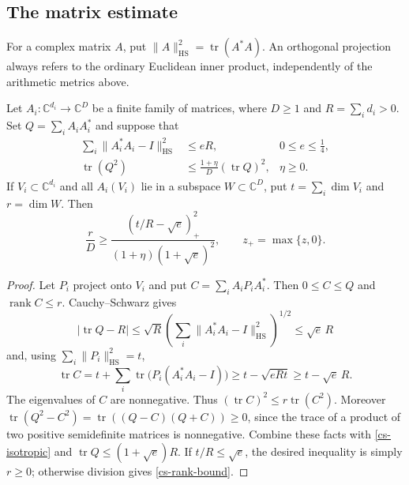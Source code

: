 \subsection{The matrix estimate}

For a complex matrix $A$, put
$\|A\|_{\mathrm{HS}}^2=\operatorname{tr}(A^*A)$.
An orthogonal projection always refers to the ordinary Euclidean inner
product, independently of the arithmetic metrics above.

\begin{lemma}\label{cs-dimension}
Let $A_i:\mathbb C^{d_i}\to\mathbb C^D$ be a finite family of matrices,
where $D\ge1$ and $R=\sum_i d_i>0$.
Set $Q=\sum_i A_iA_i^*$ and suppose that
\begin{align}
 \sum_i\|A_i^*A_i-I\|_{\mathrm{HS}}^2&\le eR,
       &0\le e\le\tfrac14,\label{cs-diagonal}\\
 \operatorname{tr}(Q^2)&\le
       \frac{1+\eta}{D}(\operatorname{tr}Q)^2,
       &\eta\ge0.\label{cs-isotropic}
\end{align}
If $V_i\subset\mathbb C^{d_i}$ and all $A_i(V_i)$ lie in a subspace
$W\subset\mathbb C^D$, put $t=\sum_i\dim V_i$ and $r=\dim W$. Then
\begin{equation}\label{cs-rank-bound}
 \frac rD\ge
 \frac{(t/R-\sqrt e)_+^2}{(1+\eta)(1+\sqrt e)^2},
 \qquad z_+=\max\{z,0\}.
\end{equation}
\end{lemma}
\begin{proof}
Let $P_i$ project onto $V_i$ and put $C=\sum_i A_iP_iA_i^*$.
Then $0\le C\le Q$ and $\operatorname{rank}C\le r$. Cauchy--Schwarz gives
\[
 |\operatorname{tr}Q-R|\le\sqrt{R}
     \left(\sum_i\|A_i^*A_i-I\|_{\mathrm{HS}}^2\right)^{1/2}
 \le\sqrt e\,R
\]
and, using $\sum_i\|P_i\|_{\mathrm{HS}}^2=t$,
\[
 \operatorname{tr}C
 =t+\sum_i\operatorname{tr}\bigl(P_i(A_i^*A_i-I)\bigr)
 \ge t-\sqrt{eRt}\ge t-\sqrt e\,R.
\]
The eigenvalues of $C$ are nonnegative. Thus
$(\operatorname{tr}C)^2\le r\operatorname{tr}(C^2)$.
Moreover
$\operatorname{tr}(Q^2-C^2)
=\operatorname{tr}((Q-C)(Q+C))\ge0$, since the trace of a product
of two positive semidefinite matrices is nonnegative. Combine these
facts with \eqref{cs-isotropic} and
$\operatorname{tr}Q\le(1+\sqrt e)R$. If $t/R\le\sqrt e$, the desired
inequality is simply $r\ge0$; otherwise division gives
\eqref{cs-rank-bound}.
\end{proof}

